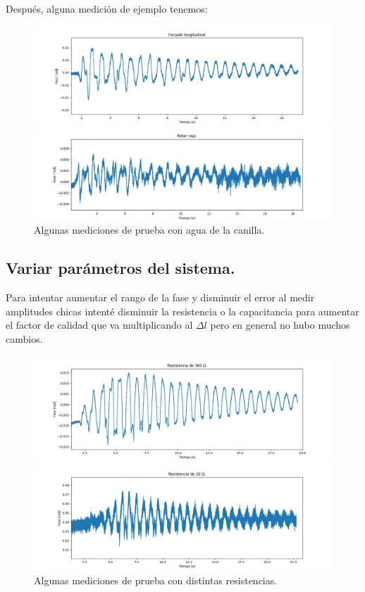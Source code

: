 Después, alguna medición de ejemplo tenemos: 
\begin{figure}[th!]
	\centering
	\includegraphics[width=0.87\linewidth]{Figures/16_06_2025/Forzado_canilla}
	
	\includegraphics[width=0.87\linewidth]{Figures/16_06_2025/Rotar_caja_canilla}
	\caption{Algunas mediciones de prueba con agua de la canilla.}
	\label{fig:forzadocanilla}
\end{figure}




\subsection*{Variar parámetros del sistema.}
Para intentar aumentar el rango de la fase y disminuir el error al medir amplitudes chicas intenté disminuir la resistencia o la capacitancia para aumentar el factor de calidad que va multiplicando al $\Delta l$ pero en general no hubo muchos cambios. 

\begin{figure}[th!]
	\centering
	\includegraphics[width=0.678\linewidth]{Figures/16_06_2025/Forzado_360Ohm.png}
	
	\includegraphics[width=0.678\linewidth]{Figures/16_06_2025/Forzado_10Ohm.png}
	\caption{Algunas mediciones de prueba con distintas resistencias.}
	\label{fig:resistencias}
\end{figure}

